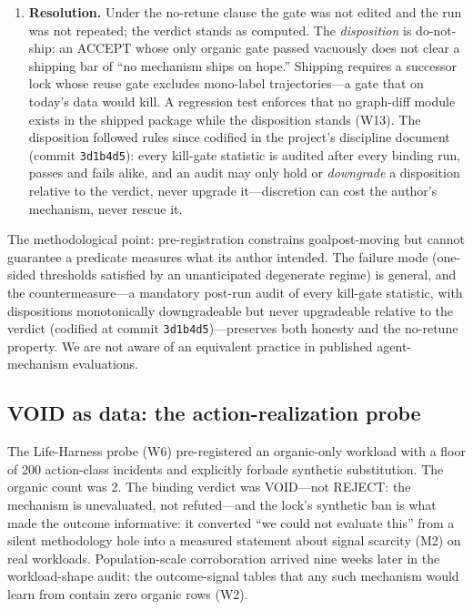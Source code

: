 \documentclass[11pt]{article}
\begin{document}
\begin{enumerate}
  \item \textbf{Resolution.} Under the no-retune clause the gate was not edited and the run was not repeated; the verdict stands as computed. The \emph{disposition} is do-not-ship: an ACCEPT whose only organic gate passed vacuously does not clear a shipping bar of ``no mechanism ships on hope.'' Shipping requires a successor lock whose reuse gate excludes mono-label trajectories---a gate that on today's data would kill. A regression test enforces that no graph-diff module exists in the shipped package while the disposition stands (W13). The disposition followed rules since codified in the project's discipline document (commit \texttt{3d1b4d5}): every kill-gate statistic is audited after every binding run, passes and fails alike, and an audit may only hold or \emph{downgrade} a disposition relative to the verdict, never upgrade it---discretion can cost the author's mechanism, never rescue it.
\end{enumerate}

The methodological point: pre-registration constrains goalpost-moving but cannot guarantee a predicate measures what its author intended. The failure mode (one-sided thresholds satisfied by an unanticipated degenerate regime) is general, and the countermeasure---a mandatory post-run audit of every kill-gate statistic, with dispositions monotonically downgradeable but never upgradeable relative to the verdict (codified at commit \texttt{3d1b4d5})---preserves both honesty and the no-retune property. We are not aware of an equivalent practice in published agent-mechanism evaluations.

\subsection{VOID as data: the action-realization probe}

The Life-Harness probe (W6) pre-registered an organic-only workload with a floor of 200 action-class incidents and explicitly forbade synthetic substitution. The organic count was 2. The binding verdict was VOID---not REJECT: the mechanism is unevaluated, not refuted---and the lock's synthetic ban is what made the outcome informative: it converted ``we could not evaluate this'' from a silent methodology hole into a measured statement about signal scarcity (M2) on real workloads. Population-scale corroboration arrived nine weeks later in the workload-shape audit: the outcome-signal tables that any such mechanism would learn from contain zero organic rows (W2).
\end{document}
